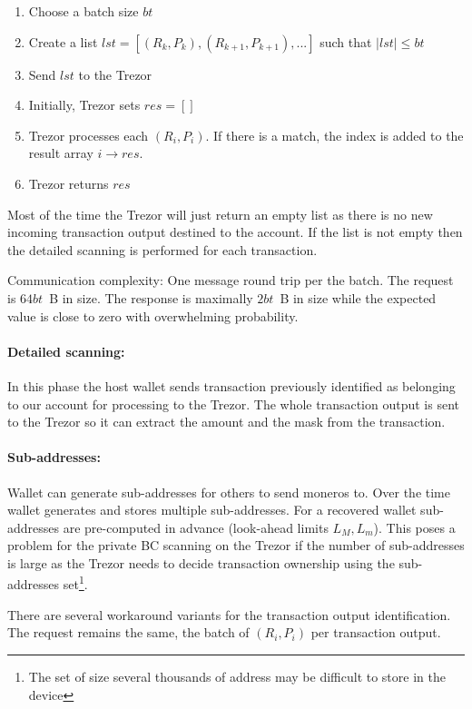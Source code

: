 \documentclass[]{article}
\begin{document}
\begin{enumerate}
	\item Choose a batch size $bt$
	\item Create a list $lst = [(R_k, P_k), (R_{k+1}, P_{k+1}), ...]$ such that $|lst| \leq bt$
	\item Send $lst$ to the Trezor
	\item Initially, Trezor sets $res = []$
	\item Trezor processes each $(R_i, P_i)$. If there is a match, the index is added to the result array $i \rightarrow res$.
	\item Trezor returns $res$ 
\end{enumerate}
Most of the time the Trezor will just return an empty list as there is no new incoming transaction output destined to the account. If the list is not empty then the detailed scanning is performed for each transaction. 

Communication complexity: One message round trip per the batch. The request is $64bt$~B in size. The response is maximally $2bt$~B in size while the expected value is close to zero with overwhelming probability. 

\paragraph{Detailed scanning:} In this phase the host wallet sends transaction previously identified as belonging to our account for processing to the Trezor. The whole transaction output is sent to the Trezor so it can extract the amount and the mask from the transaction.

\paragraph{Sub-addresses:}
Wallet can generate sub-addresses for others to send moneros to. Over the time wallet generates and stores multiple sub-addresses. 
For a recovered wallet sub-addresses are pre-computed in advance (look-ahead limits $L_M, L_m$).
This poses a problem for the private BC scanning on the Trezor if the number of sub-addresses is large as the Trezor needs to decide transaction ownership using the sub-addresses set\footnote{The set of size several thousands of address may be difficult to store in the device}.

There are several workaround variants for the transaction output identification. The request remains the same, the batch of $(R_i, P_i)$ per transaction output.
\end{document}
